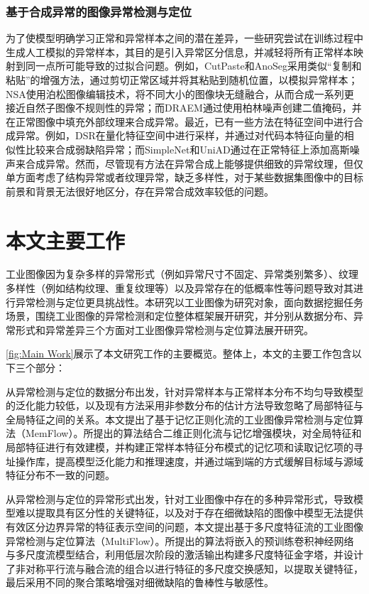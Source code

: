 \documentclass[lang=chs, degree=master, blindreview=false, adobe=false]{yanputhesis}
\begin{document}
\subsubsection{基于合成异常的图像异常检测与定位}
为了使模型明确学习正常和异常样本之间的潜在差异，一些研究\cite{zavrtanik2021draem, li2021cutpaste, song2021anoseg}尝试在训练过程中生成人工模拟的异常样本，其目的是引入异常区分信息，并减轻将所有正常样本映射到同一点所可能导致的过拟合问题。例如，CutPaste\cite{li2021cutpaste}和AnoSeg\cite{song2021anoseg}采用类似“复制和粘贴”的增强方法，通过剪切正常区域并将其粘贴到随机位置，以模拟异常样本；NSA\cite{schluter2022natural}使用泊松图像编辑技术，将不同大小的图像块无缝融合，从而合成一系列更接近自然子图像不规则性的异常；而DRAEM\cite{zavrtanik2021draem}通过使用柏林噪声创建二值掩码，并在正常图像中填充外部纹理来合成异常。最近，已有一些方法在特征空间中进行合成异常。例如，DSR\cite{zavrtanik2022dsr}在量化特征空间中进行采样，并通过对代码本特征向量的相似性比较来合成弱缺陷异常；而SimpleNet\cite{liu2023simplenet}和UniAD\cite{you2022unified}通过在正常特征上添加高斯噪声来合成异常。然而，尽管现有方法在异常合成上能够提供细致的异常纹理，但仅单方面考虑了结构异常或者纹理异常，缺乏多样性，对于某些数据集图像中的目标前景和背景无法很好地区分，存在异常合成效率较低的问题。

\section{本文主要工作}
工业图像因为复杂多样的异常形式（例如异常尺寸不固定、异常类别繁多）、纹理多样性（例如结构纹理、重复纹理等）以及异常存在的低概率性等问题导致对其进行异常检测与定位更具挑战性。本研究以工业图像为研究对象，面向数据挖掘任务场景，围绕工业图像的异常检测和定位整体框架展开研究，并分别从数据分布、异常形式和异常差异三个方面对工业图像异常检测与定位算法展开研究。

\autoref{fig:Main Work}展示了本文研究工作的主要概览。整体上，本文的主要工作包含以下三个部分：

从异常检测与定位的数据分布出发，针对异常样本与正常样本分布不均匀导致模型的泛化能力较低，以及现有方法采用非参数分布的估计方法导致忽略了局部特征与全局特征之间的关系。本文提出了基于记忆正则化流的工业图像异常检测与定位算法（MemFlow）。所提出的算法结合二维正则化流与记忆增强模块，对全局特征和局部特征进行有效建模，并构建正常样本特征分布模式的记忆项和读取记忆项的寻址操作库，提高模型泛化能力和推理速度，并通过端到端的方式缓解目标域与源域特征分布不一致的问题。

从异常检测与定位的异常形式出发，针对工业图像中存在的多种异常形式，导致模型难以提取具有区分性的关键特征，以及对于存在细微缺陷的图像中模型无法提供有效区分边界异常的特征表示空间的问题，本文提出基于多尺度特征流的工业图像异常检测与定位算法（MultiFlow）。所提出的算法将嵌入的预训练卷积神经网络与多尺度流模型结合，利用低层次阶段的激活输出构建多尺度特征金字塔，并设计了非对称平行流与融合流的组合以进行特征的多尺度交换感知，以提取关键特征，最后采用不同的聚合策略增强对细微缺陷的鲁棒性与敏感性。
\end{document}
